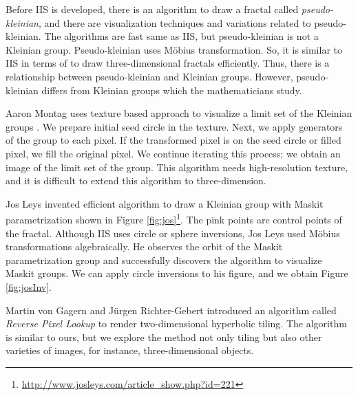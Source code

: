 Before IIS is developed, there is an algorithm to draw a fractal called
\textit{pseudo-kleinian}, and there are visualization techniques and
variations related to pseudo-kleinian.
The algorithms are fast same as IIS, but pseudo-kleinian is not a Kleinian
group.
Pseudo-kleinian uses M\"obius transformation. So, it is similar to IIS in
terms of to draw three-dimensional fractals efficiently.
Thus, there is a relationship between pseudo-kleinian and Kleinian groups.
However, pseudo-kleinian differs from Kleinian groups which the
mathematicians study.

\noindent
Aaron Montag uses texture based approach to visualize a limit set of the
Kleinian groups \cite{Montag2014hyperbolicIFS}.
We prepare initial seed circle in the texture.
Next, we apply generators of the group to each pixel.
If the transformed pixel is on the seed circle or filled pixel, we fill the original pixel.
We continue iterating this process; we obtain an image of the limit set of
the group.
This algorithm needs high-resolution texture, and it is difficult to
extend this algorithm to three-dimension.

Jos Leys invented efficient algorithm to draw a Kleinian group with Maskit
parametrization shown in Figure
\ref{fig:jos}\footnote{\url{http://www.josleys.com/article_show.php?id=221}}. 
The pink points are control points of the fractal.
Although IIS uses circle or sphere inversions, Jos Leys used
M\"obius transformations algebraically.
He observes the orbit of the Maskit parametrization group and
successfully discovers the algorithm to visualize Maskit groups.
We can apply circle inversions to his figure, and we obtain Figure \ref{fig:josInv}.

Martin von Gagern and J\"urgen Richter-Gebert introduced an algorithm
called \textit{Reverse Pixel Lookup}
\cite{journals/combinatorics/GagernR09} to render two-dimensional
hyperbolic tiling.
The algorithm is similar to ours, but
we explore the method not only tiling but also other varieties of
images, for instance, three-dimensional objects.
